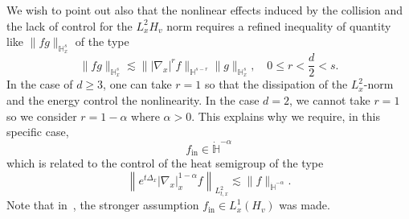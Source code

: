 \documentclass[10pt]{amsart}
\theoremstyle{definition}\newtheorem{defi}[theo]{Definition}\newtheorem{rema}[theo]{Remark}\newtheorem{exam}[theo]{Example}\newtheorem{exem}[theo]{Example}\newtheorem{nota}[theo]{Notation}
\newcommand{\ini}{\mathrm{in}}
\newcommand{\bbH}{\mathbb{H}}
\newcommand{\Ss}{H}
\renewcommand*\le{\leqslant}
\renewcommand*\ge{\geqslant}
\begin{document}
We wish to point out also that the nonlinear effects induced by the collision and the lack of control for the $L^2_{x}\Ss_v$ norm requires a refined inequality of quantity like $\| f g \|_{\bbH^s_x}$ of the type
\[
\| f g \|_{\bbH^s_x} \lesssim \| | \nabla_x |^{r} f \|_{\bbH^{s - r}} \| g \|_{\bbH^s_x}, \quad {0 \le r < \frac{d}{2} < s}.
\]
In the case of $d \ge 3$, one can take $r = 1$ so that the dissipation of the $L^2_x$-norm and the energy control the nonlinearity. In the case $d = 2$, we cannot take $r= 1$ so we consider $r = 1-\alpha$ where $\alpha > 0$. This explains why we require, in this specific case,
\[
f_\ini \in \dot{\bbH}^{-\alpha}
\]
which is related to the control of the heat semigroup of the type
\[
\left\| e^{t \Delta_x}| \nabla_x|^{1-\alpha}_x f \right\|_{L^2_{t, x}} \lesssim \| f \|_{ \dot{\bbH}^{-\alpha} }.
\]
Note that in~\cite{G2023,GT2020}, the stronger assumption $f_\ini \in L^1_x (\Ss_v)$ was made.
\end{document}
